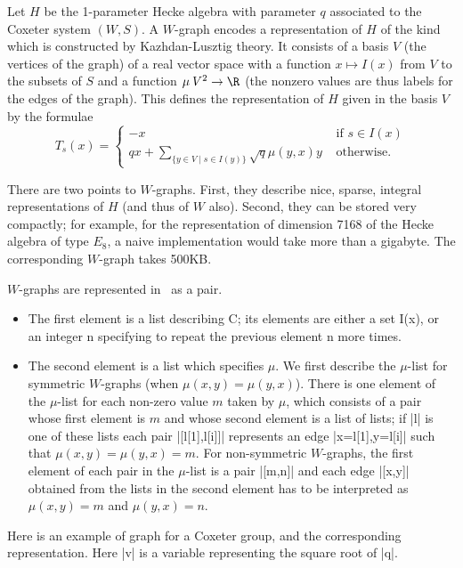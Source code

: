 
Let  $H$ be the 1-parameter Hecke  algebra with parameter $q$ associated to
the  Coxeter system $(W,S)$. A $W$-graph encodes a representation of $H$ of
the  kind which is constructed by  Kazhdan-Lusztig theory. It consists of a
basis  $V$  (the  vertices  of  the  graph)  of  a real vector space with a
function  $x\mapsto I(x)$  from $V$  to the  subsets of  $S$ and a function
$\mu\:  V^2\to\R$ (the nonzero values are thus  labels for the edges of the
graph).  This defines the representation  of $H$ given in  the basis $V$ by
the formulae
$$ T_s(x)=\left\{ \begin{array}{ll}
  -x&\text{ if $s\in I(x)$}\\
  q x+\sum_{\{y\in V\mid s\in I(y)\}} \sqrt q\mu(y,x)y&\text{ otherwise.}
\end{array}\right .$$

There  are two  points to  $W$-graphs. First,  they describe  nice, sparse,
integral representations of $H$ (and thus of $W$ also). Second, they can be
stored  very compactly;  for example,  for the  representation of dimension
7168  of the Hecke algebra of type $E_8$, a naive implementation would take
more than a gigabyte. The corresponding $W$-graph takes 500KB.

$W$-graphs are represented  in \CHEVIE\ as a  pair. 
\begin{itemize}
\item
The  first element is a list describing C; its elements are either a set
I(x),  or an integer n  specifying to repeat the  previous element n more
times.
\item
The  second element is a list which  specifies $\mu$. We first describe the
$\mu$-list  for symmetric  $W$-graphs (when  $\mu(x,y)=\mu(y,x)$). There is
one  element of the $\mu$-list for each  non-zero value $m$ taken by $\mu$,
which  consists  of  a  pair  whose  first  element is $m$ and whose second
element  is  a  list  of  lists;  if  |l|  is  one of these lists each pair
|[l[1],l[i]]| represents an edge |x=l[1],y=l[i]| such that
$\mu(x,y)=\mu(y,x)=m$.  For non-symmetric $W$-graphs,  the first element of
each  pair  in  the  $\mu$-list  is  a  pair  |[m,n]| and each edge |[x,y]|
obtained  from the  lists in  the second  element has  to be interpreted as
$\mu(x,y)=m$ and $\mu(y,x)=n$.
\end{itemize}

Here  is an  example of  graph for  a Coxeter  group, and the corresponding
representation. Here |v| is a variable representing the square root of |q|.

